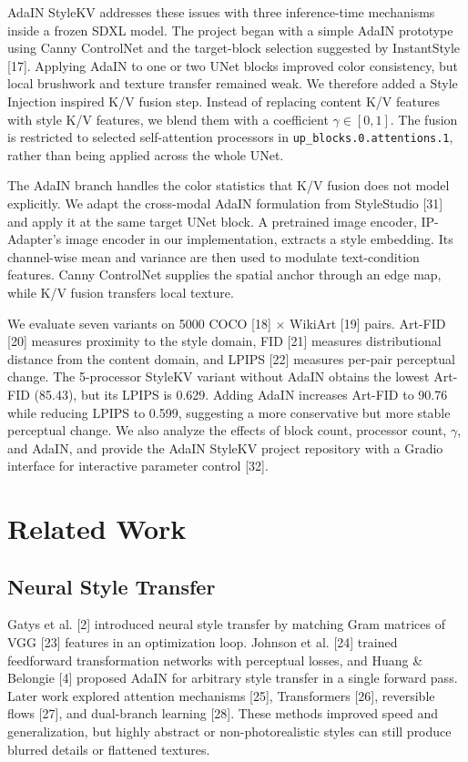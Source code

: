 \documentclass[10pt,twocolumn]{article}
\begin{document}
AdaIN StyleKV addresses these issues with three inference-time mechanisms inside a frozen SDXL model. The project began with a simple AdaIN prototype using Canny ControlNet and the target-block selection suggested by InstantStyle [17]. Applying AdaIN to one or two UNet blocks improved color consistency, but local brushwork and texture transfer remained weak. We therefore added a Style Injection inspired K/V fusion step. Instead of replacing content K/V features with style K/V features, we blend them with a coefficient $\gamma \in [0,1]$. The fusion is restricted to selected self-attention processors in \texttt{up\_blocks.0.attentions.1}, rather than being applied across the whole UNet.

The AdaIN branch handles the color statistics that K/V fusion does not model explicitly. We adapt the cross-modal AdaIN formulation from StyleStudio [31] and apply it at the same target UNet block. A pretrained image encoder, IP-Adapter's image encoder in our implementation, extracts a style embedding. Its channel-wise mean and variance are then used to modulate text-condition features. Canny ControlNet supplies the spatial anchor through an edge map, while K/V fusion transfers local texture.

We evaluate seven variants on 5000 COCO [18] $\times$ WikiArt [19] pairs. Art-FID [20] measures proximity to the style domain, FID [21] measures distributional distance from the content domain, and LPIPS [22] measures per-pair perceptual change. The 5-processor StyleKV variant without AdaIN obtains the lowest Art-FID (85.43), but its LPIPS is 0.629. Adding AdaIN increases Art-FID to 90.76 while reducing LPIPS to 0.599, suggesting a more conservative but more stable perceptual change. We also analyze the effects of block count, processor count, $\gamma$, and AdaIN, and provide the AdaIN StyleKV project repository with a Gradio interface for interactive parameter control [32].

\section{Related Work}

\subsection{Neural Style Transfer}

Gatys et al. [2] introduced neural style transfer by matching Gram matrices of VGG [23] features in an optimization loop. Johnson et al. [24] trained feedforward transformation networks with perceptual losses, and Huang \& Belongie [4] proposed AdaIN for arbitrary style transfer in a single forward pass. Later work explored attention mechanisms [25], Transformers [26], reversible flows [27], and dual-branch learning [28]. These methods improved speed and generalization, but highly abstract or non-photorealistic styles can still produce blurred details or flattened textures.
\end{document}
